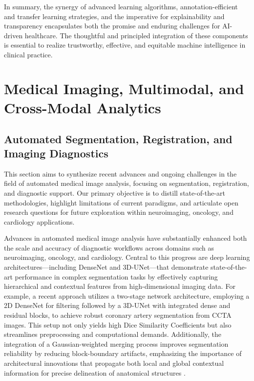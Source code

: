 \documentclass[sigconf]{acmart}
\begin{document}
In summary, the synergy of advanced learning algorithms, annotation-efficient and transfer learning strategies, and the imperative for explainability and transparency encapsulates both the promise and enduring challenges for AI-driven healthcare. The thoughtful and principled integration of these components is essential to realize trustworthy, effective, and equitable machine intelligence in clinical practice.

\section{Medical Imaging, Multimodal, and Cross-Modal Analytics}

\subsection{Automated Segmentation, Registration, and Imaging Diagnostics}

This section aims to synthesize recent advances and ongoing challenges in the field of automated medical image analysis, focusing on segmentation, registration, and diagnostic support. Our primary objective is to distill state-of-the-art methodologies, highlight limitations of current paradigms, and articulate open research questions for future exploration within neuroimaging, oncology, and cardiology applications.

Advances in automated medical image analysis have substantially enhanced both the scale and accuracy of diagnostic workflows across domains such as neuroimaging, oncology, and cardiology. Central to this progress are deep learning architectures—including DenseNet and 3D-UNet—that demonstrate state-of-the-art performance in complex segmentation tasks by effectively capturing hierarchical and contextual features from high-dimensional imaging data. For example, a recent approach utilizes a two-stage network architecture, employing a 2D DenseNet for filtering followed by a 3D-UNet with integrated dense and residual blocks, to achieve robust coronary artery segmentation from CCTA images. This setup not only yields high Dice Similarity Coefficients but also streamlines preprocessing and computational demands. Additionally, the integration of a Gaussian-weighted merging process improves segmentation reliability by reducing block-boundary artifacts, emphasizing the importance of architectural innovations that propagate both local and global contextual information for precise delineation of anatomical structures \cite{ref94,ref100}.
\end{document}
